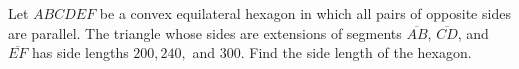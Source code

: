 Let $ABCDEF$ be a convex equilateral hexagon in which all pairs of opposite sides are parallel. The triangle whose sides are extensions of segments $\overline{AB}$, $\overline{CD}$, and $\overline{EF}$ has side lengths $200, 240,$ and $300$. Find the side length of the hexagon.
